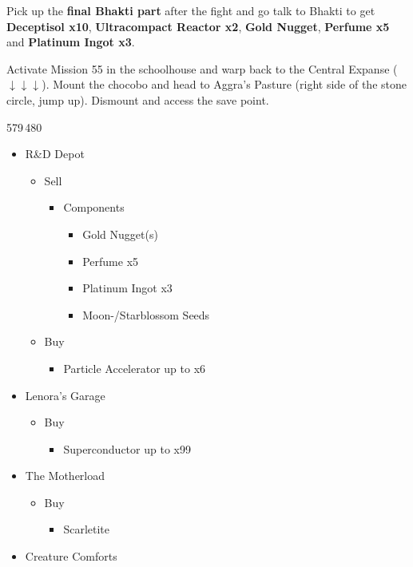 Pick up the \textbf{final Bhakti part} after the fight and go talk to Bhakti to get \textbf{Deceptisol x10}, \textbf{Ultracompact Reactor x2}, \textbf{Gold Nugget}, \textbf{Perfume x5} and \textbf{Platinum Ingot x3}.

Activate Mission 55 in the schoolhouse and warp back to the Central Expanse ($\downarrow\downarrow\downarrow$).
Mount the chocobo and head to Aggra's Pasture (right side of the stone circle, jump up).
Dismount and access the save point.

\begin{shop}{579\,480}
	\begin{itemize}
		\item R\&D Depot
			\begin{itemize}
				\item Sell
					\begin{itemize}
						\item Components
							\begin{itemize}
								\item Gold Nugget(s)
								\item Perfume x5
								\item Platinum Ingot x3
								\item Moon-/Starblossom Seeds
							\end{itemize}
					\end{itemize}
				\item Buy
					\begin{itemize}
						\item Particle Accelerator up to x6
					\end{itemize}
			\end{itemize}
		\item Lenora's Garage
			\begin{itemize}
				\item Buy
					\begin{itemize}
						\item Superconductor up to x99
					\end{itemize}
			\end{itemize}
		\item The Motherload
			\begin{itemize}
				\item Buy
					\begin{itemize}
						\item Scarletite
					\end{itemize}
			\end{itemize}
		\item Creature Comforts

\end{itemize}
\end{shop}
